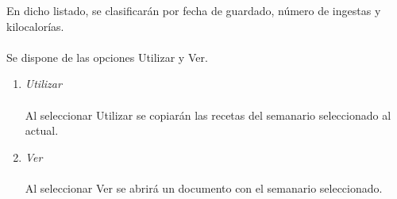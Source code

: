 En dicho listado, se clasificarán por fecha de guardado, número de ingestas y kilocalorías.\\\\
Se dispone de las opciones Utilizar y Ver.
\begin{enumerate}
\item \textit{Utilizar}\\\\
Al seleccionar Utilizar se copiarán las recetas del semanario seleccionado al actual.\\
\item \textit{Ver}\\\\
Al seleccionar Ver se abrirá un documento con el semanario seleccionado.\\
\end{enumerate}

